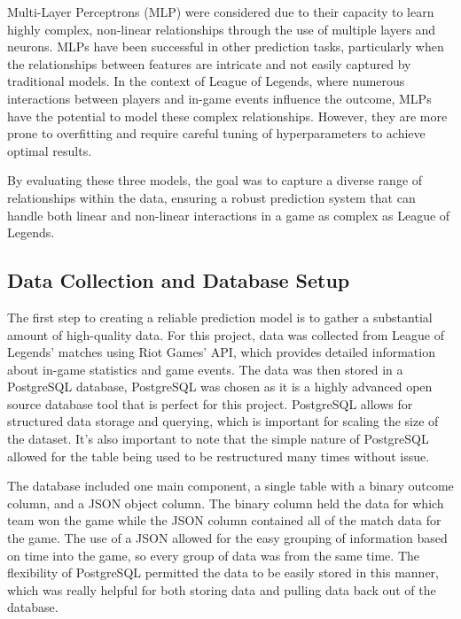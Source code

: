 \documentclass[10pt,twocolumn]{article}
\begin{document}
Multi-Layer Perceptrons (MLP) were considered due to their capacity to learn highly complex, non-linear relationships through the use of multiple layers and neurons. MLPs have been successful in other prediction tasks, particularly when the relationships between features are intricate and not easily captured by traditional models. In the context of League of Legends, where numerous interactions between players and in-game events influence the outcome, MLPs have the potential to model these complex relationships. However, they are more prone to overfitting and require careful tuning of hyperparameters to achieve optimal results.

By evaluating these three models, the goal was to capture a diverse range of relationships within the data, ensuring a robust prediction system that can handle both linear and non-linear interactions in a game as complex as League of Legends.
\subsection{Data Collection and Database Setup}
The first step to creating a reliable prediction model is to gather a substantial amount of high-quality data. For this project, data was collected from League of Legends’ matches using Riot Games' API, which provides detailed information about in-game statistics and game events. The data was then stored in a PostgreSQL database, PostgreSQL was chosen as it is a highly advanced open source database tool that is perfect for this project. PostgreSQL allows for structured data storage and querying, which is important for scaling the size of the dataset. It’s also important to note that the simple nature of PostgreSQL allowed for the table being used to be restructured many times without issue.

The database included one main component, a single table with a binary outcome column, and a JSON object column. The binary column held the data for which team won the game while the JSON column contained all of the match data for the game. The use of a JSON allowed for the easy grouping of information based on time into the game, so every group of data was from the same time. The flexibility of PostgreSQL permitted the data to be easily stored in this manner, which was really helpful for both storing data and pulling data back out of the database.
\end{document}
